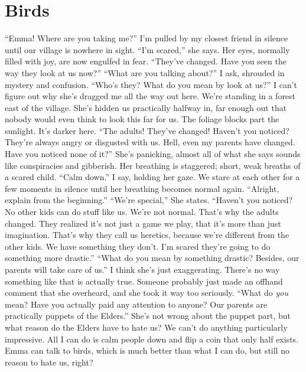 \documentclass[openany, 12pt]{book}
\newcommand\tab[1][1cm]{\hspace*{#1}}
\begin{document}
\chapter{Birds}
\tab
``Emma! Where are you taking me?'' I’m pulled by my closest friend in silence until our village is nowhere in sight. 
\newline
\tab
``I’m scared,'' she says. Her eyes, normally filled with joy, are now engulfed in fear. ``They’ve changed. Have you seen the way they look at us now?''
\newline
\tab
``What are you talking about?'' I ask, shrouded in mystery and confusion. ``Who’s they? What do you mean by look at us?'' I can’t figure out why she’s dragged me all the way out here. We’re standing in a forest east of the village. She’s hidden us practically halfway in, far enough out that nobody would even think to look this far for us. The foliage blocks part the sunlight. It’s darker here.
\newline
\tab
``The adults! They’ve changed! Haven’t you noticed? They’re always angry or disgusted with us. Hell, even my parents have changed. Have you noticed none of it?'' She’s panicking, almost all of what she says sounds like conspiracies and gibberish. Her breathing is staggered; short, weak breaths of a scared child.
\newline
\tab
``Calm down.'' I say, holding her gaze. We stare at each other for a few moments in silence until her breathing becomes normal again. ``Alright, explain from the beginning.''
\newline
\tab
``We’re special,'' She states. ``Haven’t you noticed? No other kids can do stuff like us. We’re not normal. That’s why the adults changed. They realized it’s not just a game we play, that it’s more than just imagination. That’s why they call us heretics, because we’re different from the other kids. We have something they don’t. I’m scared they’re going to do something more drastic.''
\newline
\tab
``What do you mean by something drastic? Besides, our parents will take care of us.'' I think she’s just exaggerating. There’s no way something like that is actually true. Someone probably just made an offhand comment that she overheard, and she took it way too seriously.  \newline
\tab
``What do \textit{you} mean? Have you actually paid any attention to anyone? Our parents are practically puppets of the Elders.'' She’s not wrong about the puppet part, but what reason do the Elders have to hate us? We can’t do anything particularly impressive.  All I can do is calm people down and flip a coin that only half exists. Emma can talk to birds, which is much better than what I can do, but still no reason to hate us, right?
\end{document}

